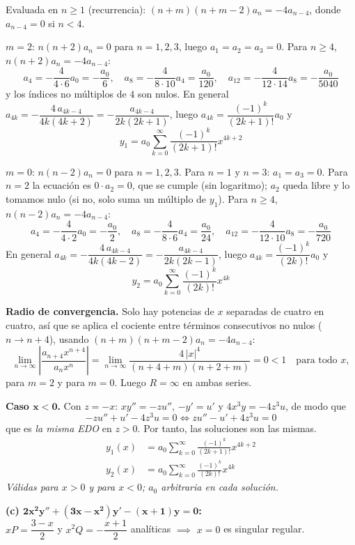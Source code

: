 \documentclass[11pt, a4paper]{article}
\begin{document}
\smallskip\noindent Evaluada en $n\geq1$ (recurrencia): $(n+m)(n+m-2)a_n=-4a_{n-4}$, donde $a_{n-4}=0$ si $n<4$.

\smallskip\noindent $m=2$: $n(n+2)a_n=0$ para $n=1,2,3$, luego $a_1=a_2=a_3=0$. Para $n\geq4$, $n(n+2)a_n=-4a_{n-4}$:
\[
a_4=-\frac{4}{4\cdot6}a_0=-\frac{a_0}{6},\quad a_8=-\frac{4}{8\cdot10}a_4=\frac{a_0}{120},\quad a_{12}=-\frac{4}{12\cdot14}a_8=-\frac{a_0}{5040}
\]
y los índices no múltiplos de $4$ son nulos. En general $a_{4k}=-\dfrac{4\,a_{4k-4}}{4k(4k+2)}=-\dfrac{a_{4k-4}}{2k(2k+1)}$, luego $a_{4k}=\dfrac{(-1)^k}{(2k+1)!}a_0$ y
\[
y_1=a_0\sum_{k=0}^\infty\frac{(-1)^k}{(2k+1)!}x^{4k+2}
\]

\smallskip\noindent $m=0$: $n(n-2)a_n=0$ para $n=1,2,3$. Para $n=1$ y $n=3$: $a_1=a_3=0$. Para $n=2$ la ecuación es $0\cdot a_2=0$, que se cumple (sin logaritmo); $a_2$ queda libre y lo tomamos nulo (si no, solo suma un múltiplo de $y_1$). Para $n\geq4$, $n(n-2)a_n=-4a_{n-4}$:
\[
a_4=-\frac{4}{4\cdot2}a_0=-\frac{a_0}{2},\quad a_8=-\frac{4}{8\cdot6}a_4=\frac{a_0}{24},\quad a_{12}=-\frac{4}{12\cdot10}a_8=-\frac{a_0}{720}
\]
En general $a_{4k}=-\dfrac{4\,a_{4k-4}}{4k(4k-2)}=-\dfrac{a_{4k-4}}{2k(2k-1)}$, luego $a_{4k}=\dfrac{(-1)^k}{(2k)!}a_0$ y
\[
y_2=a_0\sum_{k=0}^\infty\frac{(-1)^k}{(2k)!}x^{4k}
\]

\smallskip\noindent\textbf{Radio de convergencia.} Solo hay potencias de $x$ separadas de cuatro en cuatro, así que se aplica el cociente entre términos consecutivos no nulos ($n\to n+4$), usando $(n+m)(n+m-2)a_n=-4a_{n-4}$:
\[
\lim_{n\to\infty}\left|\frac{a_{n+4}x^{n+4}}{a_nx^n}\right|=\lim_{n\to\infty}\frac{4\,|x|^4}{(n+4+m)(n+2+m)}=0<1 \quad\text{para todo }x,
\]
para $m=2$ y para $m=0$. Luego $R=\infty$ en ambas series.

\vspace{0.2cm}\noindent\textbf{Caso $\bm{x<0}$.} Con $z=-x$: $xy''=-zu''$, $-y'=u'$ y $4x^3y=-4z^3u$, de modo que
\[
-zu''+u'-4z^3u=0 \iff zu''-u'+4z^3u=0
\]
que es \emph{la misma EDO} en $z>0$. Por tanto, las soluciones son las mismas.
\[
\boxed{\begin{aligned}y_1(x)&=a_0\sum_{k=0}^\infty\frac{(-1)^k}{(2k+1)!}x^{4k+2} \\[2pt] y_2(x)&=a_0\sum_{k=0}^\infty\frac{(-1)^k}{(2k)!}x^{4k}\end{aligned}}
\]
\textit{Válidas para $x>0$ y para $x<0$; $a_0$ arbitraria en cada solución.}

\medskip
\noindent\textbf{(c) $\bm{2x^2y''+(3x-x^2)y'-(x+1)y=0}$:} \\
$xP=\dfrac{3-x}{2}$ y $x^2Q=-\dfrac{x+1}{2}$ analíticas $\implies$ $x=0$ es singular regular.
\end{document}
